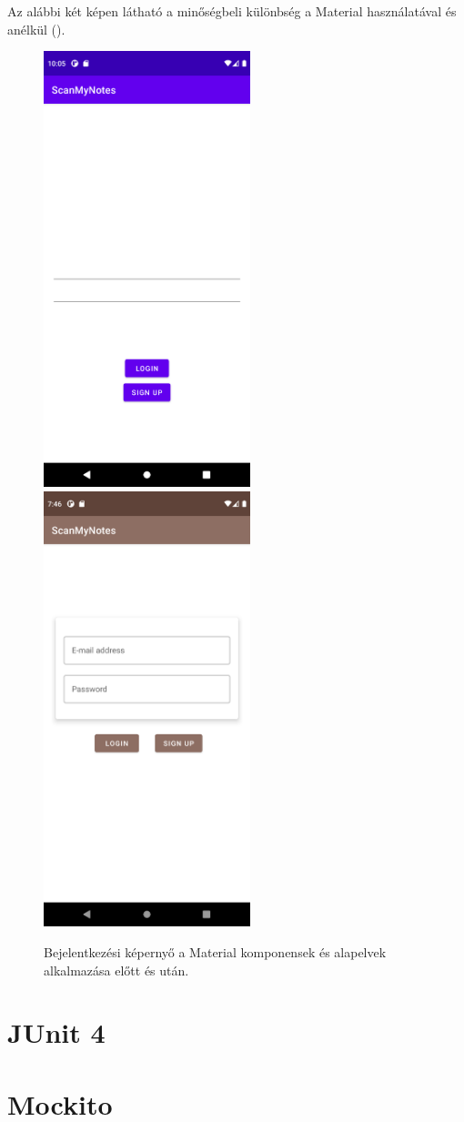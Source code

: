 Az alábbi két képen látható a minőségbeli különbség a Material használatával és anélkül ().

\begin{figure}[!ht]
	\centering
	\includegraphics[width=60mm, keepaspectratio]{figures/login_screenshot_before.png}
	\includegraphics[width=60mm, keepaspectratio]{figures/login_screenshot_after.png}
	\caption{Bejelentkezési képernyő a Material komponensek és alapelvek alkalmazása előtt és után.}
	\label{fig:MaterialBeforeAfter}
\end{figure}

\section{JUnit 4}

\section{Mockito}